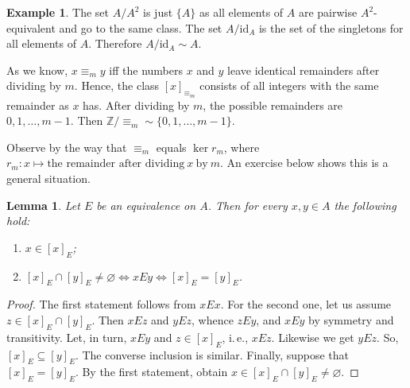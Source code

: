 \documentclass[12pt,notitlepage]{article}
\theoremstyle{plain}
\newtheorem{lemma}[thm]{Lemma}
\theoremstyle{definition}
\newtheorem{exm}[thm]{Example}
\theoremstyle{plain}
\newcommand{\Z}{\mathbb{Z}}
\newcommand{\R}{\mathbb{R}}
\newcommand{\sbs}{\subseteq}
\newcommand{\void}{\varnothing}
\newcommand{\rng}{\mathop{\mathrm{rng}}}
\newcommand{\id}{\mathrm{id}}
\newcommand{\1}{\mathbf{1}}
\newcommand{\0}{\mathbf{0}}
\begin{document}
\begin{exm}
The set $A / A^2$ is just $\{A\}$ as all elements of $A$ are pairwise $A^2$-equivalent and go to the same class. The set $A / \id_A$ is the set of the singletons for all elements of $A$. Therefore $A / \id_A \sim A$.

As we know, $x \equiv_m y$ iff the numbers $x$ and $y$ leave identical remainders after dividing by $m$. Hence, the class $[x]_{\equiv_m}$ consists of all integers with the same remainder as $x$ has. After dividing by $m$, the possible remainders are $0,1,\ldots,m - 1$. Then $\Z / {\equiv_m} \sim \{0,1,\ldots,m - 1\}$.

Observe by the way that $\equiv_m$ equals $\ker r_m$, where  $r_m \colon x \mapsto \mbox{the remainder after dividing}\ x\ \mbox{by}\ m$. An exercise below shows this is a general situation.

\end{exm}


\begin{lemma}\label{ch0:eq_class}
Let $E$ be an equivalence on $A$. Then for every $x,y\in A$ the following hold:
\begin{enumerate}
\item $x \in [x]_E$;
\item $[x]_E \cap [y]_E \neq \void \iff xEy \iff [x]_E = [y]_E$.
\end{enumerate}
\end{lemma}
\begin{proof}
The first statement follows from $xEx$. For the second one, let us assume $z \in [x]_E \cap [y]_E$. Then $x E z$ and $y E z$, whence $z E y$, and $x E y$ by symmetry and transitivity. Let, in turn, $x E y$  and $z \in [x]_E$, i.\,e., $x E z$. Likewise we get $y E z$. So, $[x]_E \sbs [y]_E$. The converse inclusion is similar. Finally, suppose that $[x]_E = [y]_E$. By the first statement, obtain $x \in [x]_E \cap [y]_E \neq \void$.
\end{proof}
\end{document}
